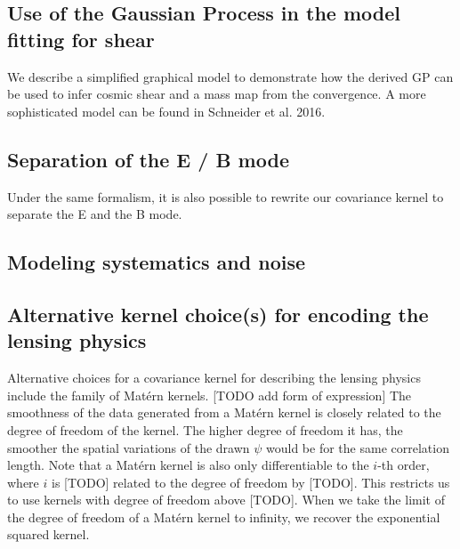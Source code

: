 \subsection{Use of the Gaussian Process in the model fitting for shear}
We describe a simplified graphical model to demonstrate how the derived GP can
be used to infer cosmic shear and a mass map from the convergence.
A more sophisticated model can be found in Schneider et al. 2016.







\subsection{Separation of the E / B mode}
Under the same formalism, it is also possible to rewrite our covariance kernel 
to separate the E and the B mode. 

\subsection{Modeling systematics and noise}

\subsection{Alternative kernel choice(s) for encoding the lensing physics}
Alternative choices for a covariance kernel for describing the lensing physics 
include the family of Mat\'{e}rn kernels.
[TODO add form of expression] 
The smoothness of the data generated from a Mat\'{e}rn kernel is closely
related to the degree of freedom of the kernel. 
The higher degree of freedom it has, the smoother the spatial variations of the
drawn $\psi$ would be for the same correlation length.
Note that a Mat\'{e}rn kernel is also only differentiable to the $i$-th order,
where $i$ is [TODO] related to the degree of freedom by [TODO].
This restricts us to use kernels with degree of freedom above [TODO]. 
When we take the limit of the degree of freedom of a Mat\'{e}rn kernel to infinity, 
we recover the exponential squared kernel.


